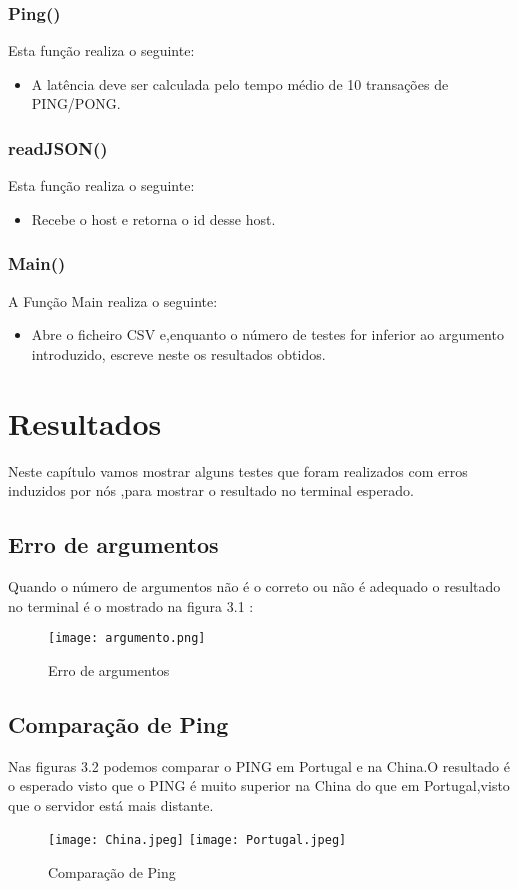\documentclass{report}
\begin{document}
\subsection{Ping()}
Esta função realiza o seguinte:
\begin{itemize}
    \item A latência deve ser calculada pelo tempo médio de 10 transações de PING/PONG.
\end{itemize}

\subsection{readJSON()}
Esta função realiza o seguinte:
\begin{itemize}
    \item Recebe o host e retorna o id desse host.
\end{itemize}

\subsection{Main()}
A Função Main realiza o seguinte:
\begin{itemize}
    \item Abre o ficheiro \ac{CSV} e,enquanto o número de testes for inferior ao argumento introduzido, escreve neste os resultados obtidos.
\end{itemize}

\chapter{Resultados}
\label{chap.resultados}
Neste capítulo vamos mostrar alguns testes que foram realizados com erros induzidos por nós ,para mostrar o resultado no terminal esperado.
\section{Erro de argumentos}
Quando o número de argumentos não é o correto ou não é adequado o resultado no terminal é o mostrado na figura 3.1 :
\begin{figure}
    \centering
    \texttt{[image: argumento.png]}
    \caption{Erro de argumentos}
    \label{argumentos}
\end{figure}
\section{Comparação de Ping}
Nas figuras 3.2 podemos comparar o PING em Portugal e na China.O resultado é o esperado visto que o PING é muito superior na China do que em Portugal,visto que o servidor está mais distante.
\begin{figure}
    \centering
    \texttt{[image: China.jpeg]}
    \texttt{[image: Portugal.jpeg]}
    \caption{Comparação de Ping}
    \label{fig:my_label}
\end{figure}
\end{document}
